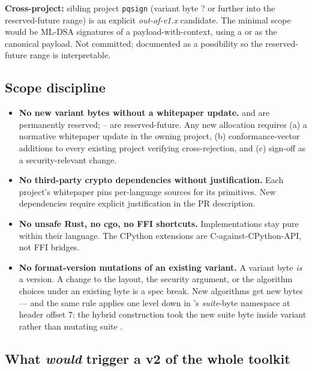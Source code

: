 \textbf{Cross-project:} sibling project \texttt{pqsign} (variant byte ? or further into the reserved-future range) is an explicit \emph{out-of-v1.x} candidate. The minimal scope would be ML-DSA \citep{fips204} signatures of a payload-with-context, using a \tesseraid{} or \tesserahash{} as the canonical payload. Not committed; documented as a possibility so the reserved-future range is interpretable.

\subsection{Scope discipline}

\begin{itemize}
\item \textbf{No new variant bytes without a whitepaper update.}  and  are permanently reserved; -- are reserved-future. Any new allocation requires (a) a normative whitepaper update in the owning project, (b) conformance-vector additions to every existing project verifying cross-rejection, and (c) sign-off as a security-relevant change.
\item \textbf{No third-party crypto dependencies without justification.} Each project's whitepaper pins per-language sources for its primitives. New dependencies require explicit justification in the PR description.
\item \textbf{No unsafe Rust, no cgo, no FFI shortcuts.} Implementations stay pure within their language. The CPython extensions are C-against-CPython-API, not FFI bridges.
\item \textbf{No format-version mutations of an existing variant.} A variant byte \emph{is} a version. A change to the layout, the security argument, or the algorithm choices under an existing byte is a spec break. New algorithms get new bytes --- and the same rule applies one level down in \tesseraseal{}'s \emph{suite}-byte namespace at header offset 7: the hybrid construction took the new suite byte  inside variant  rather than mutating suite .
\end{itemize}

\subsection{What \emph{would} trigger a v2 of the whole toolkit}


